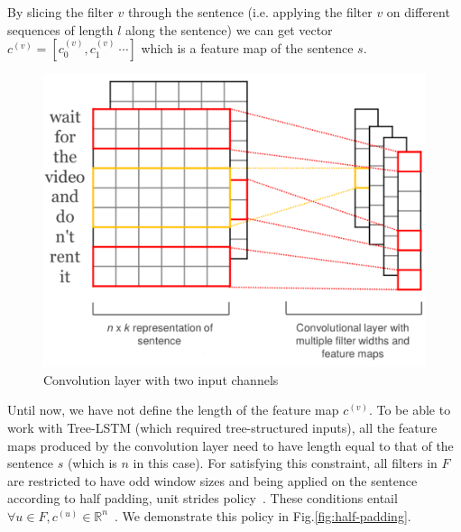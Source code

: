 By slicing the filter \(v\) through the sentence (i.e. applying the filter \(v\) on different sequences of length \(l\) along the sentence) we can get vector \(c^{(v)} = [c^{(v)}_0, c^{(v)}_1~\cdots]\) which is a feature map of the sentence \(s\).

\begin{figure}[H]
    \centering
    \includegraphics[scale=0.3]{figure/cnn-module}
    \caption[Convolution layer with two input channels]{Convolution layer with two input channels}
    \label{fig:cnn-module}
\end{figure}

Until now, we have not define the length of the feature map \(c^{(v)}\). 
To be able to work with Tree-LSTM (which required tree-structured inputs), all the feature maps produced by the convolution layer need to have length equal to that of the sentence \(s\) (which is \(n\) in this case).
For satisfying this constraint, all filters in \(F\) are restricted to have odd window sizes and being applied on the sentence according to half padding, unit strides policy~\cite{conv-arith}.
These conditions entail \({\forall u \in F,  c^{(u)} \in \mathbb{R}^n}\)~\cite{conv-arith}.
We demonstrate this policy in Fig.\ref{fig:half-padding}.

